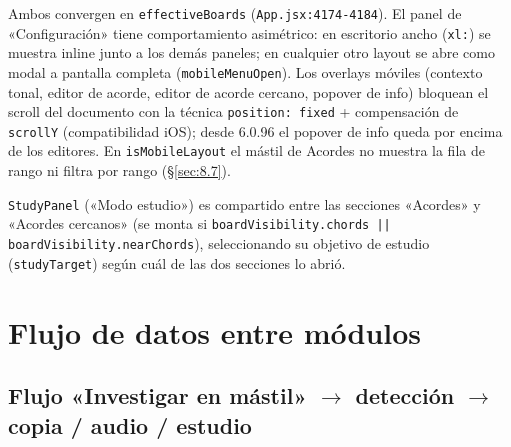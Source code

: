 \documentclass[a4paper,11pt,oneside]{report}
\newcommand{\Sref}[1]{\S\ref{#1}}
\begin{document}
Ambos convergen en \lstinline!effectiveBoards! (\lstinline!App.jsx:4174-4184!). El panel de «Configuración» tiene comportamiento asimétrico: en escritorio ancho (\lstinline!xl:!) se muestra inline junto a los demás paneles; en cualquier otro layout se abre como modal a pantalla completa (\lstinline!mobileMenuOpen!). Los overlays móviles (contexto tonal, editor de acorde, editor de acorde cercano, popover de info) bloquean el scroll del documento con la técnica \lstinline!position: fixed! + compensación de \lstinline!scrollY! (compatibilidad iOS); desde 6.0.96 el popover de info queda por encima de los editores. En \lstinline!isMobileLayout! el mástil de Acordes no muestra la fila de rango ni filtra por rango (\Sref{sec:8.7}).

\lstinline!StudyPanel! («Modo estudio») es compartido entre las secciones «Acordes» y «Acordes cercanos» (se monta si \lstinline!boardVisibility.chords || boardVisibility.nearChords!), seleccionando su objetivo de estudio (\lstinline!studyTarget!) según cuál de las dos secciones lo abrió.

\chapter{Flujo de datos entre módulos}
\label{sec:14}

\section{\texorpdfstring{Flujo «Investigar en mástil» $\to$ detección $\to$ copia / audio / estudio}{Flujo «Investigar en mástil» -> detección -> copia / audio / estudio}}
\label{sec:14.1}
\end{document}
